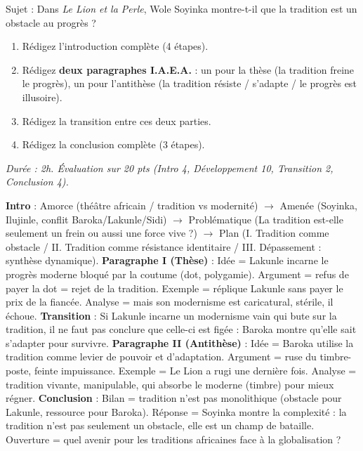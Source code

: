 \documentclass[11pt]{article}
\begin{document}
\begin{exercice}
Sujet : \og Dans \emph{Le Lion et la Perle}, Wole Soyinka montre-t-il que la tradition est un obstacle au progrès ? \fg
\begin{enumerate}
\item Rédigez l'introduction complète (4 étapes).
\item Rédigez \textbf{deux paragraphes I.A.E.A.} : un pour la thèse (la tradition freine le progrès), un pour l'antithèse (la tradition résiste / s'adapte / le progrès est illusoire).
\item Rédigez la transition entre ces deux parties.
\item Rédigez la conclusion complète (3 étapes).
\end{enumerate}
\textit{Durée : 2h. Évaluation sur 20 pts (Intro 4, Développement 10, Transition 2, Conclusion 4).}
\end{exercice}

\begin{corrige}
\textbf{Intro} : Amorce (théâtre africain / tradition vs modernité) $\rightarrow$ Amenée (Soyinka, Ilujinle, conflit Baroka/Lakunle/Sidi) $\rightarrow$ Problématique (La tradition est-elle seulement un frein ou aussi une force vive ?) $\rightarrow$ Plan (I. Tradition comme obstacle / II. Tradition comme résistance identitaire / III. Dépassement : synthèse dynamique).
\textbf{Paragraphe I (Thèse)} : Idée = Lakunle incarne le progrès moderne bloqué par la coutume (dot, polygamie). Argument = refus de payer la dot = rejet de la tradition. Exemple = réplique Lakunle \og sans payer le prix de la fiancée\fg. Analyse = mais son modernisme est caricatural, stérile, il échoue.
\textbf{Transition} : \og Si Lakunle incarne un modernisme vain qui bute sur la tradition, il ne faut pas conclure que celle-ci est figée : Baroka montre qu'elle sait s'adapter pour survivre.\fg
\textbf{Paragraphe II (Antithèse)} : Idée = Baroka utilise la tradition comme levier de pouvoir et d'adaptation. Argument = ruse du timbre-poste, feinte impuissance. Exemple = \og Le Lion a rugi une dernière fois\fg. Analyse = tradition vivante, manipulable, qui absorbe le moderne (timbre) pour mieux régner.
\textbf{Conclusion} : Bilan = tradition n'est pas monolithique (obstacle pour Lakunle, ressource pour Baroka). Réponse = Soyinka montre la complexité : la tradition n'est pas seulement un obstacle, elle est un champ de bataille. Ouverture = quel avenir pour les traditions africaines face à la globalisation ?
\end{corrige}
\end{document}

